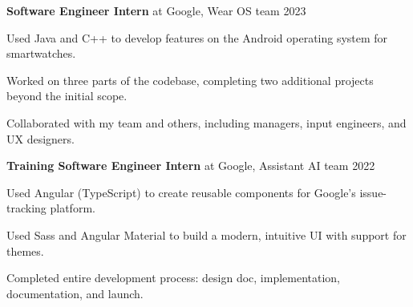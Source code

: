 \begin{entry}
	{{\bf Software Engineer Intern} at Google, Wear OS team}
	{2023}

	Used Java and C++ to develop features on the Android operating system for smartwatches.

	Worked on three parts of the codebase, completing two additional projects beyond the initial scope.

	Collaborated with my team and others, including managers, input engineers, and UX designers.
\end{entry}

\vspace*{0.1cm}

\begin{entry}
	{{\bf Training Software Engineer Intern} at Google, Assistant AI team}
	{2022}

	Used Angular (TypeScript) to create reusable components for Google's issue-tracking platform.

	Used Sass and Angular Material to build a modern, intuitive UI with support for themes.

	Completed entire development process: design doc, implementation, documentation, and launch.
\end{entry}
